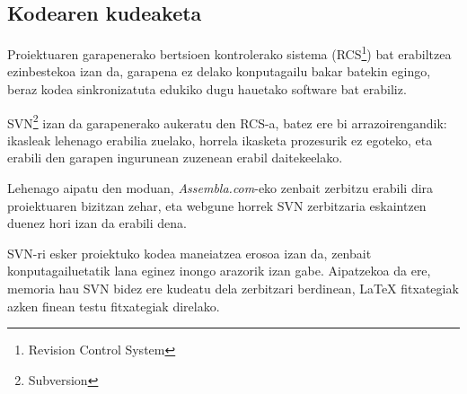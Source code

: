 \subsection{Kodearen kudeaketa}
Proiektuaren garapenerako bertsioen kontrolerako sistema (RCS\footnote{Revision Control System}) bat erabiltzea ezinbestekoa izan da, garapena ez delako konputagailu bakar batekin egingo, beraz kodea sinkronizatuta edukiko dugu hauetako software bat erabiliz.

SVN\footnote{Subversion} izan da garapenerako aukeratu den RCS-a, batez ere bi arrazoirengandik: ikasleak lehenago erabilia zuelako, horrela ikasketa prozesurik ez egoteko, eta erabili den garapen ingurunean zuzenean erabil daitekeelako.

Lehenago aipatu den moduan, \textit{Assembla.com}-eko zenbait zerbitzu erabili dira proiektuaren bizitzan zehar, eta webgune horrek SVN zerbitzaria eskaintzen duenez hori izan da erabili dena.

SVN-ri esker proiektuko kodea maneiatzea erosoa izan da, zenbait konputagailuetatik lana eginez inongo arazorik izan gabe. Aipatzekoa da ere, memoria hau SVN bidez ere kudeatu dela zerbitzari berdinean, \LaTeX{} fitxategiak azken finean testu fitxategiak direlako.

